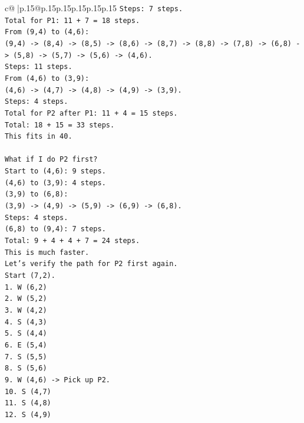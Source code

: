 \documentclass{article}
\begin{document}
{\begin{supertabular}{c@{$\;$}|p{.15\linewidth}@{}p{.15\linewidth}p{.15\linewidth}p{.15\linewidth}p{.15\linewidth}p{.15\linewidth}}
{{{\texttt{Steps: 7 steps.} \\
\texttt{Total for P1: 11 + 7 = 18 steps.} \\
\texttt{From (9,4) to (4,6):} \\
\texttt{(9,4) {-}> (8,4) {-}> (8,5) {-}> (8,6) {-}> (8,7) {-}> (8,8) {-}> (7,8) {-}> (6,8) {-}> (5,8) {-}> (5,7) {-}> (5,6) {-}> (4,6).} \\
\texttt{Steps: 11 steps.} \\
\texttt{From (4,6) to (3,9):} \\
\texttt{(4,6) {-}> (4,7) {-}> (4,8) {-}> (4,9) {-}> (3,9).} \\
\texttt{Steps: 4 steps.} \\
\texttt{Total for P2 after P1: 11 + 4 = 15 steps.} \\
\texttt{Total: 18 + 15 = 33 steps.} \\
\texttt{This fits in 40.} \\
\\ 
\texttt{What if I do P2 first?} \\
\texttt{Start to (4,6): 9 steps.} \\
\texttt{(4,6) to (3,9): 4 steps.} \\
\texttt{(3,9) to (6,8):} \\
\texttt{(3,9) {-}> (4,9) {-}> (5,9) {-}> (6,9) {-}> (6,8).} \\
\texttt{Steps: 4 steps.} \\
\texttt{(6,8) to (9,4): 7 steps.} \\
\texttt{Total: 9 + 4 + 4 + 7 = 24 steps.} \\
\texttt{This is much faster.} \\
\texttt{Let's verify the path for P2 first again.} \\
\texttt{Start (7,2).} \\
\texttt{1. W (6,2)} \\
\texttt{2. W (5,2)} \\
\texttt{3. W (4,2)} \\
\texttt{4. S (4,3)} \\
\texttt{5. S (4,4)} \\
\texttt{6. E (5,4)} \\
\texttt{7. S (5,5)} \\
\texttt{8. S (5,6)} \\
\texttt{9. W (4,6) {-}> Pick up P2.} \\
\texttt{10. S (4,7)} \\
\texttt{11. S (4,8)} \\
\texttt{12. S (4,9)} \\
}}}
\end{supertabular}}
\end{document}
